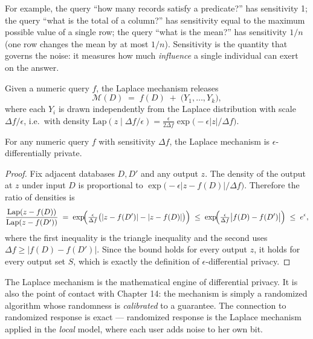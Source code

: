 For example, the query ``how many records satisfy a predicate?'' has sensitivity 1; the query ``what is the total of a column?'' has sensitivity equal to the maximum possible value of a single row; the query ``what is the mean?'' has sensitivity $1/n$ (one row changes the mean by at most $1/n$). Sensitivity is the quantity that governs the noise: it measures how much \emph{influence} a single individual can exert on the answer.

\begin{definition}
Given a numeric query $f$, the Laplace mechanism releases
\[
\mathcal{M}(D) \;=\; f(D) \;+\; \bigl(Y_1, \ldots, Y_k\bigr),
\]
where each $Y_i$ is drawn independently from the Laplace distribution with scale $\Delta f / \epsilon$, i.e.\ with density $\mathrm{Lap}(z \mid \Delta f / \epsilon) = \frac{\epsilon}{2\Delta f} \exp\bigl(-\epsilon |z| / \Delta f\bigr)$.
\end{definition}

\begin{theorem}
\label{thm:dp:laplace}
For any numeric query $f$ with sensitivity $\Delta f$, the Laplace mechanism is $\epsilon$-differentially private.
\end{theorem}

\begin{proof}
Fix adjacent databases $D, D'$ and any output $z$. The density of the output at $z$ under input $D$ is proportional to $\exp\bigl(-\epsilon |z - f(D)| / \Delta f\bigr)$. Therefore the ratio of densities is
\[
\frac{\mathrm{Lap}(z - f(D))}{\mathrm{Lap}(z - f(D'))}
\;=\;
\exp\!\Bigl(\tfrac{\epsilon}{\Delta f}\bigl(|z - f(D')| - |z - f(D)|\bigr)\Bigr)
\;\le\;
\exp\!\Bigl(\tfrac{\epsilon}{\Delta f}\bigl|f(D) - f(D')\bigr|\Bigr)
\;\le\;
e^{\epsilon},
\]
where the first inequality is the triangle inequality and the second uses $\Delta f \ge |f(D) - f(D')|$. Since the bound holds for every output $z$, it holds for every output set $S$, which is exactly the definition of $\epsilon$-differential privacy.
\end{proof}

The Laplace mechanism is the mathematical engine of differential privacy. It is also the point of contact with Chapter 14: the mechanism is simply a randomized algorithm whose randomness is \emph{calibrated} to a guarantee. The connection to randomized response is exact --- randomized response is the Laplace mechanism applied in the \emph{local} model, where each user adds noise to her own bit.

